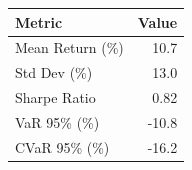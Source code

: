 

\begin{tabular}{@{}lr@{}}
\toprule
Metric & Value \\
\midrule
Mean Return (\%) & 10.7 \\
Std Dev (\%) & 13.0 \\
Sharpe Ratio & 0.82 \\
VaR 95\% (\%) & -10.8 \\
CVaR 95\% (\%) & -16.2 \\
\bottomrule
\end{tabular}